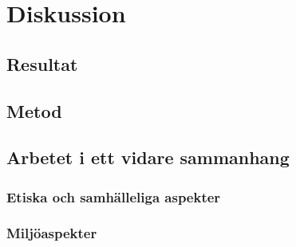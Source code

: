\section{Diskussion}

\subsection{Resultat}

\subsection{Metod}

\subsection{Arbetet i ett vidare sammanhang}

\subsubsection{Etiska och samhälleliga aspekter}

\subsubsection{Miljöaspekter}
